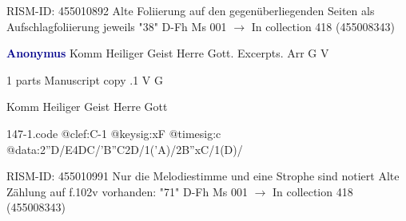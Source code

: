 \documentclass[twocolumn]{book}
\begin{document}
\newline RISM-ID: 455010892
\newline Alte Foliierung auf den gegenüberliegenden Seiten als Aufschlagfoliierung jeweils "38"
\newline D-Fh  Ms 001
\newline $\rightarrow$ In collection 418 (455008343)

\newline \par \vspace{7pt} \textcolor{darkblue}{\textbf{Anonymus  }}
\newline Komm Heiliger Geist Herre Gott. Excerpts. Arr  G  
\newline V
\newline \begin{itshape}\end{itshape} 
\newline \textcolor{darkblue}{}  1 parts  
\newline Manuscript copy
.1  V  G
\newline \begin{footnotesize} Komm Heiliger Geist Herre Gott \end{footnotesize}  
\begin{filecontents*}{147-1.code}
@clef:C-1
@keysig:xF
@timesig:c
@data:2''D/E4DC/'B''C2D/1('A)/2B''xC/1(D)/
\end{filecontents*}
\newline
%

\newline RISM-ID: 455010991
\newline Nur die Melodiestimme und eine Strophe sind notiert
\newline Alte Zählung auf f.102v vorhanden: "71"
\newline D-Fh  Ms 001
\newline $\rightarrow$ In collection 418 (455008343)
\end{document}
